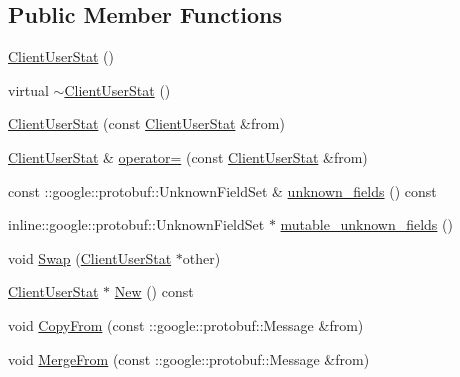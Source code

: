 \subsection*{Public Member Functions}
\begin{DoxyCompactItemize}
\item 
\hyperlink{class_i_m_1_1_base_define_1_1_client_user_stat_a2e988871e5a3e6df10760325151b498d}{Client\+User\+Stat} ()
\item 
virtual \hyperlink{class_i_m_1_1_base_define_1_1_client_user_stat_a9a65f8e216b71271fb2e77f0d29b7047}{$\sim$\+Client\+User\+Stat} ()
\item 
\hyperlink{class_i_m_1_1_base_define_1_1_client_user_stat_a715fb1ac086ff8ddb1bd47b7706bec36}{Client\+User\+Stat} (const \hyperlink{class_i_m_1_1_base_define_1_1_client_user_stat}{Client\+User\+Stat} \&from)
\item 
\hyperlink{class_i_m_1_1_base_define_1_1_client_user_stat}{Client\+User\+Stat} \& \hyperlink{class_i_m_1_1_base_define_1_1_client_user_stat_abf6c6c6d6cd920562a2dca88a4d5e0dd}{operator=} (const \hyperlink{class_i_m_1_1_base_define_1_1_client_user_stat}{Client\+User\+Stat} \&from)
\item 
const \+::google\+::protobuf\+::\+Unknown\+Field\+Set \& \hyperlink{class_i_m_1_1_base_define_1_1_client_user_stat_a24a19a497221a9e78067183b95da21e5}{unknown\+\_\+fields} () const 
\item 
inline\+::google\+::protobuf\+::\+Unknown\+Field\+Set $\ast$ \hyperlink{class_i_m_1_1_base_define_1_1_client_user_stat_a865bee69207edde480f9bff3d78cfd5b}{mutable\+\_\+unknown\+\_\+fields} ()
\item 
void \hyperlink{class_i_m_1_1_base_define_1_1_client_user_stat_af61645a3181ed81779eef50a94af10d5}{Swap} (\hyperlink{class_i_m_1_1_base_define_1_1_client_user_stat}{Client\+User\+Stat} $\ast$other)
\item 
\hyperlink{class_i_m_1_1_base_define_1_1_client_user_stat}{Client\+User\+Stat} $\ast$ \hyperlink{class_i_m_1_1_base_define_1_1_client_user_stat_ae983e50d4eacac19113e21560b1cc788}{New} () const 
\item 
void \hyperlink{class_i_m_1_1_base_define_1_1_client_user_stat_a9fbf325d667c1e5715b1b5e66d7f3993}{Copy\+From} (const \+::google\+::protobuf\+::\+Message \&from)
\item 
void \hyperlink{class_i_m_1_1_base_define_1_1_client_user_stat_a0000228e072b19f9137cfb45b3b41483}{Merge\+From} (const \+::google\+::protobuf\+::\+Message \&from)
\item 

\end{DoxyCompactItemize}
